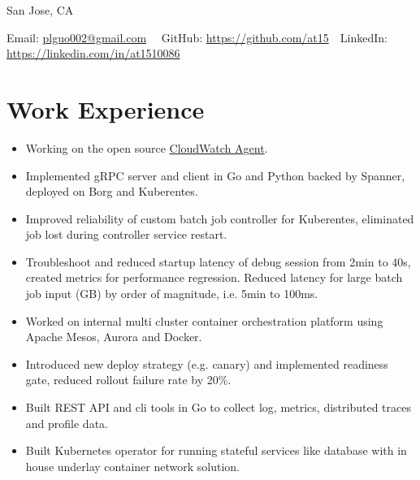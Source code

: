 \documentclass[11pt, letterpaper]{simple-cv}
\begin{document}
\centerline{
	San Jose, CA\ \
}
\centerline{
	Email: \href{plguo002@gmail.com}{plguo002@gmail.com}\ \
	GitHub: \href{https://github.com/at15}{https://github.com/at15}\ \
	LinkedIn: \href{https://www.linkedin.com/in/at1510086}{https://linkedin.com/in/at1510086}}

\section{Work Experience}

\begin{itemize}
	\item Working on the open source \href{https://github.com/aws/amazon-cloudwatch-agent}{CloudWatch Agent}.
\end{itemize}

\begin{itemize}
	\item Implemented gRPC server and client in Go and Python backed by Spanner, deployed on Borg and Kuberentes.
	\item Improved reliability of custom batch job controller for Kuberentes, eliminated job lost during controller service restart.
	\item Troubleshoot and reduced startup latency of debug session from 2min to 40s, created metrics for performance regression.
	Reduced latency for large batch job input (GB) by order of magnitude, i.e. 5min to 100ms.
\end{itemize}

\begin{itemize}
	\item Worked on internal multi cluster container orchestration platform using Apache Mesos, Aurora and Docker.
	\item Introduced new deploy strategy (e.g. canary) and implemented readiness gate, reduced rollout failure rate by 20\%.
	\item Built REST API and cli tools in Go to collect log, metrics, distributed traces and profile data.
	\item Built Kubernetes operator for running stateful services like database with in house underlay container network solution.
\end{itemize}
\end{document}
